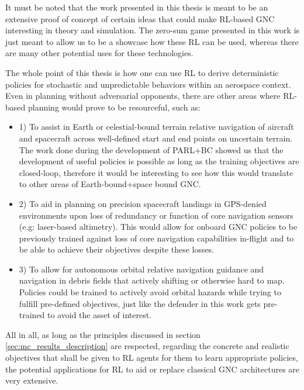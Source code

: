 It must be noted that the work presented in this thesis is meant to be an extensive proof of concept of certain ideas that could make RL-based GNC interesting in theory and simulation. The zero-sum game presented in this work is just meant to allow us to be a showcase how these RL can be used, whereas there are many other potential uses for these technologies.

The whole point of this thesis is how one can use RL to derive deterministic policies for stochastic and unpredictable behaviors within an aerospace context. Even in planning without adversarial opponents, there are other areas where RL-based planning would prove to be resourceful, such as:

\begin{itemize}

    \item 1) To assist in Earth or celestial-bound terrain relative navigation of aircraft and spacecraft across well-defined start and end points on uncertain terrain. The work done during the development of PARL+BC showed us that the development of useful policies is possible as long as the training objectives are closed-loop, therefore it would be interesting to see how this would translate to other areas of Earth-bound+space bound GNC.
    
    
    \item 2) To aid in planning on precision spacecraft landings in GPS-denied environments upon loss of redundancy or function of core navigation sensors (e.g: laser-based altimetry). This would allow for onboard GNC policies to be previously trained against loss of core navigation capabilities in-flight and to be able to achieve their objectives despite these losses.

    \item 3) To allow for autonomous orbital relative navigation guidance and navigation in debris fields that actively shifting or otherwise hard to map. Policies could be trained to actively avoid orbital hazards while trying to fulfill pre-defined objectives, just like the defender in this work gets pre-trained to avoid the asset of interest.
\end{itemize}


All in all, as long as the principles discussed in section \ref{sec:mc_results_description} are respected, regarding the concrete and realistic objectives that shall be given to RL agents for them to learn appropriate policies, the potential applications for RL to aid or replace classical GNC architectures are very extensive.
